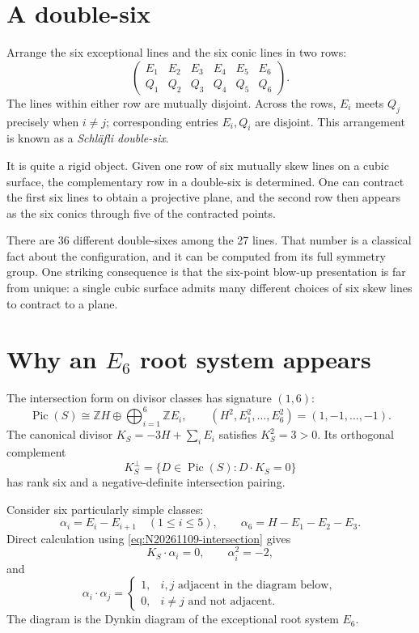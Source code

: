 \section{A double-six}

Arrange the six exceptional lines and the six conic lines in two rows:
\[
 \begin{pmatrix}
 E_1&E_2&E_3&E_4&E_5&E_6\\
 Q_1&Q_2&Q_3&Q_4&Q_5&Q_6
 \end{pmatrix}.
\]
The lines within either row are mutually disjoint. Across the rows, \(E_i\) meets \(Q_j\) precisely when \(i\ne j\); corresponding entries \(E_i,Q_i\) are disjoint. This arrangement is known as a \emph{Schl\"afli double-six}.

It is quite a rigid object. Given one row of six mutually skew lines on a cubic surface, the complementary row in a double-six is determined. One can contract the first six lines to obtain a projective plane, and the second row then appears as the six conics through five of the contracted points.

There are \(36\) different double-sixes among the 27 lines. That number is a classical fact about the configuration, and it can be computed from its full symmetry group. One striking consequence is that the six-point blow-up presentation is far from unique: a single cubic surface admits many different choices of six skew lines to contract to a plane.

\section{Why an \(E_6\) root system appears}

The intersection form on divisor classes has signature \((1,6)\):
\[
 \operatorname{Pic}(S)\cong\mathbb ZH
 \oplus\bigoplus_{i=1}^6\mathbb ZE_i,
 \qquad
 (H^2,E_1^2,\ldots,E_6^2)=(1,-1,\ldots,-1).
\]
The canonical divisor \(K_S=-3H+\sum_iE_i\) satisfies \(K_S^2=3>0\). Its orthogonal complement
\[
 K_S^\perp=\{D\in\operatorname{Pic}(S):D\cdot K_S=0\}
\]
has rank six and a negative-definite intersection pairing.

Consider six particularly simple classes:
\begin{equation}
 \alpha_i=E_i-E_{i+1}\quad(1\leq i\leq5),
 \qquad
 \alpha_6=H-E_1-E_2-E_3.
 \label{eq:N20261109-simple-roots}
\end{equation}
Direct calculation using \eqref{eq:N20261109-intersection} gives
\[
 K_S\cdot\alpha_i=0,\qquad \alpha_i^2=-2,
\]
and
\[
 \alpha_i\cdot\alpha_j=
 \begin{cases}
 1,&\text{\(i,j\) adjacent in the diagram below},\\
 0,&i\ne j\text{ and not adjacent}.
 \end{cases}
\]
The diagram is the Dynkin diagram of the exceptional root system \(E_6\).

